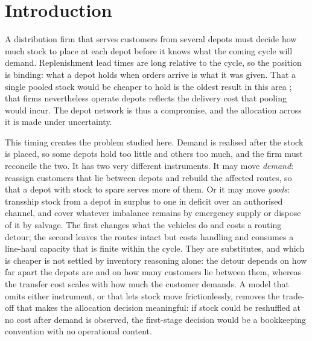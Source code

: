 \documentclass[authoryear,final,3p,times]{elsarticle}
\theoremstyle{definition}
\theoremstyle{plain}
\begin{document}
\section{Introduction}
\label{sec:introduction}

A distribution firm that serves customers from several depots must decide how
much stock to place at each depot before it knows what the coming cycle will
demand. Replenishment lead times are long relative to the cycle, so the
position is binding: what a depot holds when orders arrive is what it was
given. That a single pooled stock would be cheaper to hold is the oldest
result in this area \citep{eppen1979centralization}; that firms nevertheless
operate depots reflects the delivery cost that pooling would incur. The depot
network is thus a compromise, and the allocation across it is made under
uncertainty.

This timing creates the problem studied here. Demand is realised after the
stock is placed, so some depots hold too little and others too much, and the
firm must reconcile the two. It has two very different instruments. It may
move \emph{demand}: reassign customers that lie between depots and rebuild the
affected routes, so that a depot with stock to spare serves more of them. Or
it may move \emph{goods}: transship stock from a depot in surplus to one in
deficit over an authorised channel, and cover whatever imbalance remains by
emergency supply or dispose of it by salvage. The first changes what the
vehicles do and costs a routing detour; the second leaves the routes intact but
costs handling and consumes a line-haul capacity that is finite within the
cycle. They are substitutes, and which is cheaper is not settled by inventory
reasoning alone: the detour depends on how far apart the depots are and on how
many customers lie between them, whereas the transfer cost scales with how much
the customer demands. A model that omits either instrument, or that lets stock
move frictionlessly, removes the trade-off that makes the allocation decision
meaningful: if stock could be reshuffled at no cost after demand is observed,
the first-stage decision would be a bookkeeping convention with no operational
content.
\end{document}
